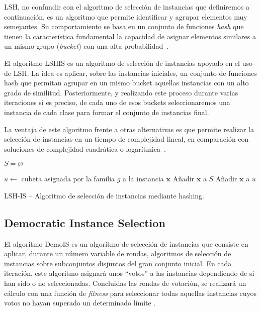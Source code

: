 LSH, no confundir con el algoritmo de selección de instancias que definiremos a continuación, es un algoritmo que permite identificar y agrupar elementos muy semejantes. Su comportamiento se basa en un conjunto de funciones \textit{hash} que tienen la característica fundamental la capacidad de asignar elementos similares a un mismo grupo (\textit{bucket}) con una alta probabilidad~\cite{LSHISPaper}.

El algoritmo LSHIS es un algoritmo de selección de instancias apoyado en el uso de LSH. La idea es aplicar, sobre las instancias iniciales, un conjunto de funciones hash que permitan agrupar en un mismo bucket aquellas instancias con un alto grado de similitud. Posteriormente, y realizando este proceso durante varias iteraciones si es preciso, de cada uno de esos buckets seleccionaremos una instancia de cada clase para formar el conjunto de instancias final. 

La ventaja de este algoritmo frente a otras alternativas es que permite realizar la selección de instancias en un tiempo de complejidad lineal, en comparación con soluciones de complejidad cuadrática o logarítmica~\cite{LSHISPaper}.


\begin{algorithm*}
\DontPrintSemicolon
{}

$ S = \varnothing $

 {
   {
     $u\leftarrow$ cubeta asignada por la familia $g$ a la instancia $\mathbf{x}$ \;
     {
       Añadir $ \mathbf{x} $ a $ S $ \;
       Añadir $ \mathbf{x} $ a $ u $ \;
     }
  }
}

\caption{LSH-IS -- Algoritmo de selección de instancias mediante hashing. \cite{LSHISPaper}}
\label{alg:LSHIS}
\end{algorithm*}

\subsection{Democratic Instance Selection}\label{sec:defDemoIS}

El algoritmo DemoIS es un algoritmo de selección de instancias que consiste en aplicar, durante un número variable de rondas, algoritmos de selección de instancias sobre subconjuntos disjuntos del gran conjunto inicial. En cada iteración, este algoritmo asignará unos ``votos'' a las instancias dependiendo de si han sido o no seleccionadas. Concluidas las rondas de votación, se realizará un cálculo con una función de \textit{fitness} para seleccionar todas aquellas instancias cuyos votos no hayan superado un determinado límite \cite{DemoISPaper}.
 
